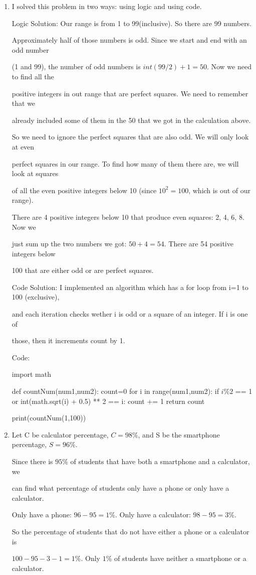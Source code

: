 \documentclass[11pt]{article}
\begin{document}
\begin{enumerate}[label=(\alph*)]

\item
I solved this problem in two ways: using logic and using code. 

Logic Solution: Our range is from 1 to 99(inclusive). So there are 99 numbers. 

Approximately half of those numbers is odd. Since we start and end with an odd number

(1 and 99), the number of odd numbers is $int(99/2)+1=50$. Now we need to find all the

positive integers in out range that are perfect squares. We need to remember that we 

already included some of them in the 50 that we got in the calculation above. 

So we need to ignore the perfect squares that are also odd. We will only look at even 

perfect squares in our range. To find how many of them there are, we will look at squares 

of all the even positive integers below 10 (since $10^2=100$, which is out of our range).

There are 4 positive integers below 10 that produce even squares: 2, 4, 6, 8. Now we 

just sum up the two numbers we got: $50+4=54$. There are 54 positive integers below

100 that are either odd or are perfect squares.

Code Solution: I implemented an algorithm which has a for loop from i=1 to 100 (exclusive), 

and each iteration checks wether i is odd or a square of an integer. If i is one of

those, then it increments count by 1.

Code:

import math

def countNum(num1,num2):
    count=0
    for i in range(num1,num2):
        if $i\%2$ == 1 or int(math.sqrt(i) + 0.5) ** 2 == i:
            count += 1
    return count
    
print(countNum(1,100))


\item

Let C be calculator percentage, $C=98\%$, and S be the smartphone percentage, $S=96\%$.

Since there is $95\%$ of students that have both a smartphone and a calculator, we

can find what percentage of students only have a phone or only have a calculator.

Only have a phone: $96-95=1\%$. Only have a calculator: $98-95=3\%$. 

So the percentage of students that do not have either a phone or a calculator is

$100-95-3-1=1\%$. Only $1\%$ of students have neither a smartphone or a calculator.

\end{enumerate}
\end{document}
